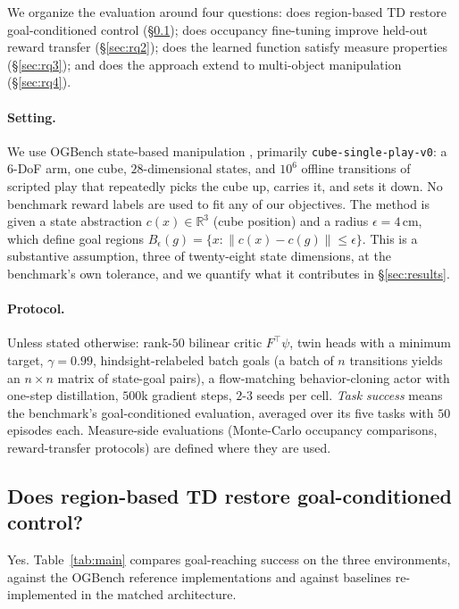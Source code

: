 \documentclass{article}
\newcommand{\cube}{c}
\begin{document}
We organize the evaluation around four questions: does region-based TD restore goal-conditioned control (\S\ref{sec:rq1}); does occupancy fine-tuning improve held-out reward transfer (\S\ref{sec:rq2}); does the learned function satisfy measure properties (\S\ref{sec:rq3}); and does the approach extend to multi-object manipulation (\S\ref{sec:rq4}).

\paragraph{Setting.}
We use OGBench state-based manipulation \citep{park2024ogbench}, primarily \texttt{cube-single-play-v0}: a $6$-DoF arm, one cube, $28$-dimensional states, and $10^6$ offline transitions of scripted play that repeatedly picks the cube up, carries it, and sets it down.
No benchmark reward labels are used to fit any of our objectives.
The method is given a state abstraction $\cube(x)\in\mathbb{R}^3$ (cube position) and a radius $\epsilon=4$\,cm, which define goal regions $B_\epsilon(g)=\{x:\|\cube(x)-\cube(g)\|\le\epsilon\}$.
This is a substantive assumption, three of twenty-eight state dimensions, at the benchmark's own tolerance, and we quantify what it contributes in \S\ref{sec:results}.

\paragraph{Protocol.}
Unless stated otherwise: rank-$50$ bilinear critic $F^\top\psi$, twin heads with a minimum target, $\gamma=0.99$, hindsight-relabeled batch goals (a batch of $n$ transitions yields an $n\times n$ matrix of state-goal pairs), a flow-matching behavior-cloning actor with one-step distillation, $500$k gradient steps, $2$-$3$ seeds per cell.
\emph{Task success} means the benchmark's goal-conditioned evaluation, averaged over its five tasks with $50$ episodes each.
Measure-side evaluations (Monte-Carlo occupancy comparisons, reward-transfer protocols) are defined where they are used.

\subsection{Does region-based TD restore goal-conditioned control?}
\label{sec:rq1}\label{sec:results}

Yes.
Table~\ref{tab:main} compares goal-reaching success on the three environments, against the OGBench reference implementations and against baselines re-implemented in the matched architecture.
\end{document}
